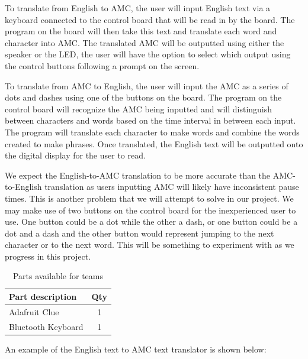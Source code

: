 \documentclass[12pt]{article}
\begin{document}
	 To translate from English to AMC, the user will input English text via a keyboard connected to the control board that will be read in by the board. The program on the board will then take this text and translate each word and character into AMC. The translated AMC will be outputted using either the speaker or the LED, the user will have the option to select which output using the control buttons following a prompt on the screen.
	 
	 To translate from AMC to English, the user will input the AMC as a series of dots and dashes using one of the buttons on the board. The program on the control board will recognize the AMC being inputted and will distinguish between characters and words based on the time interval in between each input. The program will translate each character to make words and combine the words created to make phrases. Once translated, the English text will be outputted onto the digital display for the user to read. 
	 
	 We expect the English-to-AMC translation to be more accurate than the AMC-to-English translation as users inputting AMC will likely have inconsistent pause times. This is another problem that we will attempt to solve in our project. We may make use of two buttons on the control board for the inexperienced user to use. One button could be a dot while the other a dash, or one button could be a dot and a dash and the other button would represent jumping to the next character or to the next word. This will be something to experiment with as we progress in this project.
	 
	\begin{table}[ht]
		\caption{Parts available for teams}
		\label{table:parts_list}
		\begin{center}
			\begin{tabular}{|p{3in}|c|}
				
				\hline
				Part description & Qty\\
				\hline
				\hline
				Adafruit Clue & 1 \\
				\hline
				Bluetooth Keyboard & 1 \\
				\hline
			\end{tabular}
		\end{center}
	\end{table}
	
	An example of the English text to AMC text translator is shown below:
	
\end{document}

